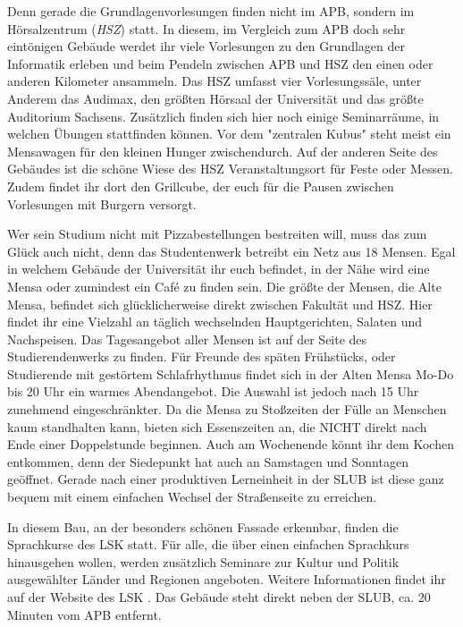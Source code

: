 Denn gerade die Grundlagenvorlesungen finden nicht im APB, sondern im Hörsalzentrum (\emph{HSZ}) statt.
In diesem, im Vergleich zum APB doch sehr eintönigen Gebäude werdet ihr viele Vorlesungen zu den Grundlagen der Informatik erleben und beim Pendeln zwischen APB und HSZ den einen oder anderen Kilometer ansammeln.
Das HSZ umfasst vier Vorlesungssäle, unter Anderem das Audimax, den größten Hörsaal der Universität und das größte Auditorium Sachsens.
Zusätzlich finden sich hier noch einige Seminarräume, in welchen Übungen stattfinden können. Vor dem "zentralen Kubus" steht meist ein Mensawagen für den kleinen Hunger zwischendurch.
Auf der anderen Seite des Gebäudes ist die schöne Wiese des HSZ Veranstaltungsort für Feste oder Messen.
Zudem findet ihr dort den Grillcube, der euch für die Pausen zwischen Vorlesungen mit Burgern versorgt.

Wer sein Studium nicht mit Pizzabestellungen bestreiten will, muss das zum Glück auch nicht, denn das Studentenwerk betreibt ein Netz aus 18 Mensen.
Egal in welchem Gebäude der Universität ihr euch befindet, in der Nähe wird eine Mensa oder zumindest ein Café zu finden sein.
Die größte der Mensen, die Alte Mensa, befindet sich glücklicherweise direkt zwischen Fakultät und HSZ.
Hier findet ihr eine Vielzahl an täglich wechselnden Hauptgerichten, Salaten und Nachspeisen.
Das Tagesangebot aller Mensen ist auf der Seite des Studierendenwerks  zu finden.
Für Freunde des späten Frühstücks, oder Studierende mit gestörtem Schlafrhythmus findet sich in der Alten Mensa Mo-Do bis 20 Uhr ein warmes Abendangebot. Die Auswahl ist jedoch nach 15 Uhr zunehmend eingeschränkter.
Da die Mensa zu Stoßzeiten der Fülle an Menschen kaum standhalten kann, bieten sich Essenszeiten an, die NICHT direkt nach Ende einer Doppelstunde beginnen.
Auch am Wochenende könnt ihr dem Kochen entkommen, denn der Siedepunkt hat auch an Samstagen und Sonntagen geöffnet.
Gerade nach einer produktiven Lerneinheit in der SLUB ist diese ganz bequem mit einem einfachen Wechsel der Straßenseite zu erreichen.


In diesem Bau, an der besonders schönen Fassade erkennbar, finden die Sprachkurse des LSK statt.
Für alle, die über einen einfachen Sprachkurs hinausgehen wollen, werden zusätzlich Seminare zur Kultur und Politik ausgewählter Länder und Regionen angeboten.
Weitere Informationen findet ihr auf der Website des LSK .
Das Gebäude steht direkt neben der SLUB, ca. 20 Minuten vom APB entfernt.
